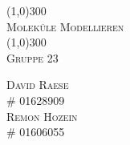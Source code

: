 \begin{titlepage}
  
  \begin{center}
    \line(1,0){300}\\
    [0.25in]
    \textsc{\Huge{Moleküle Modellieren}}\\
    [3mm]
    \line(1,0){300}\\
    [1in]
    \textsc{\Large{Gruppe 23}}\\
    [6.6in]

    \begin{flushright}
      \textsc{David Raese\\
      \# 01628909}\\
      \textsc{Remon Hozein\\
      \# 01606055}
    \end{flushright}
  \end{center}
\end{titlepage}
